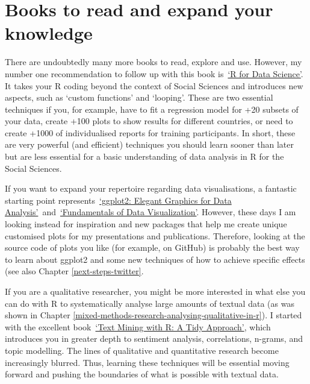 \documentclass[
]{book}
\begin{document}
\hypertarget{books-to-read-and-expand-your-knowledge}{%
\section{Books to read and expand your knowledge}\label{books-to-read-and-expand-your-knowledge}}

There are undoubtedly many more books to read, explore and use. However, my number one recommendation to follow up with this book is~\href{https://r4ds.had.co.nz}{`R for Data Science'}. It takes your R coding beyond the context of Social Sciences and introduces new aspects, such as `custom functions' and `looping'. These are two essential techniques if you, for example, have to fit a regression model for +20 subsets of your data, create +100 plots to show results for different countries, or need to create +1000 of individualised reports for training participants. In short, these are very powerful (and efficient) techniques you should learn sooner than later but are less essential for a basic understanding of data analysis in R for the Social Sciences.

If you want to expand your repertoire regarding data visualisations, a fantastic starting point represents~\href{https://ggplot2-book.org}{`ggplot2: Elegant Graphics for Data Analysis'}~and~\href{https://clauswilke.com/dataviz/}{`Fundamentals of Data Visualization'}. However, these days I am looking instead for inspiration and new packages that help me create unique customised plots for my presentations and publications. Therefore, looking at the source code of plots you like (for example, on GitHub) is probably the best way to learn about ggplot2 and some new techniques of how to achieve specific effects (see also Chapter \ref{next-steps-twitter}.

If you are a qualitative researcher, you might be more interested in what else you can do with R to systematically analyse large amounts of textual data (as was shown in Chapter \ref{mixed-methods-research-analysing-qualitative-in-r}). I started with the excellent book~\href{https://www.tidytextmining.com}{`Text Mining with R: A Tidy Approach'}, which introduces you in greater depth to sentiment analysis, correlations, n-grams, and topic modelling. The lines of qualitative and quantitative research become increasingly blurred. Thus, learning these techniques will be essential moving forward and pushing the boundaries of what is possible with textual data.
\end{document}
